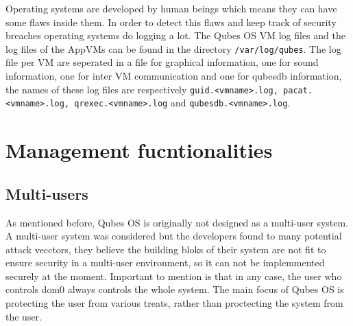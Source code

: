 \documentclass[runningheads,a4paper]{article}
\begin{document}
Operating systems are developed by human beings which means they can
have some flaws inside them. In order to detect this flaws and keep
track of security breaches operating systems do logging a lot. The
Qubes OS VM log files and the log files of the AppVMs can be found in
the directory \texttt{/var/log/qubes}. The log file per VM are
seperated in a file for graphical information, one for sound
information, one for inter VM communication and one for qubesdb
information, the names of these log files are respectively
\texttt{guid.<vmname>.log, pacat.<vmname>.log, qrexec.<vmname>.log}
and \texttt{qubesdb.<vmname>.log}.

\section{Management fucntionalities}
\subsection{Multi-users} 

As mentioned before, Qubes OS is originally
not designed as a multi-user system.  A multi-user system was
considered but the developers found to many potential attack vecctors,
they believe the building bloks of their system are not fit to ensure
security in a multi-user environment, so it can not be implemmented
securely at the moment. Important to mention is that in any case, the
user who controls dom0 always controls the whole system. The main
focus of Qubes OS is protecting the user from various treats, rather
than proctecting the system from the user.
\end{document}
